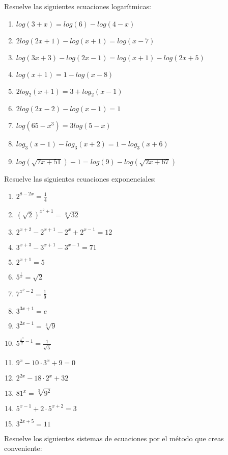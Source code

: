 \Exercicio Resuelve las siguientes ecuaciones logarítmicas:

\begin{enumerate}[topsep=0pt]
	\item $ log(3+x) = log (6) -log(4-x) $
	\item $ 2 log(2x+1) - log(x+1) = log(x-7)$
	\item $ log(3x+3) - log(2x-1) = log(x+1) - log(2x+5)$
	\item $ log(x+1) = 1 - log(x-8)$
	\item $ 2log_2(x+1) = 3 + log_2(x-1)$
	\item $ 2log(2x-2)-log(x-1) = 1$
	\item $ log(65-x^3)= 3log(5-x)$
	\item $ log_3(x-1) - log_3 (x+2) = 1 - log_3(x+6)$
	\item $ log(\sqrt{7x+51}) -1 = log(9) - log(\sqrt{2x+67})$
\end{enumerate}

\Exercicio Resuelve las siguientes ecuaciones exponenciales:

\begin{enumerate}[topsep=0pt]
	\item $ 2^{8-2x} = \frac{1}{4} $
	\item $ (\sqrt{2})^{x^2+1} = \sqrt[8]{32}$
	\item $ 2^{x+2} - 2^{x+1} - 2^x + 2^{x-1} = 12$
	\item $ 3^{x+3} - 3^{x+1} - 3^{x-1} = 71 $
	\item $ 2^{x+1} = 5 $
	\item $ 5^{\frac{1}{x}} = \sqrt{2} $
	\item $ 7^{x^2-2} = \frac{1}{9}$
	\item $ 3^{3x+1} = e$
	\item $ 3^{2x-1} = \sqrt[3]{9}$
	\item $ 5^{\frac{x^2}{2}-1} = \frac{1}{\sqrt{5}}$
	\item $ 9^x - 10 \cdot 3^x + 9 = 0$
	\item $ 2^{2x} - 18 \cdot 2^x + 32$
	\item $ 81^x = \sqrt[3]{9^2}$
	\item $ 5^{x-1} + 2 \cdot 5^{x+2} = 3$
	\item $ 3^{2x+5} = 11$
\end{enumerate}


\Exercicio Resuelve los siguientes sistemas de ecuaciones por el método que creas conveniente:


